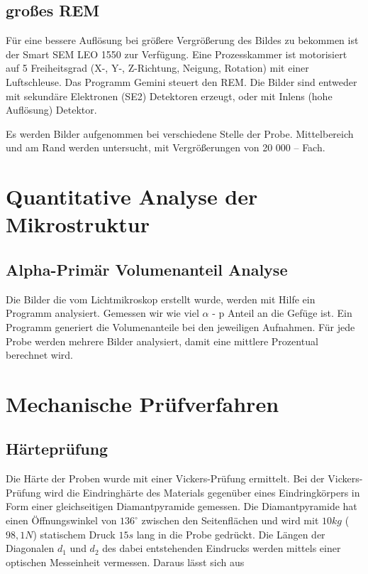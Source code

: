 	\subsection{großes REM}
		
Für eine bessere Auflösung bei größere Vergrößerung des Bildes zu bekommen ist der Smart SEM LEO 1550 zur Verfügung. Eine Prozesskammer ist motorisiert auf 5 Freiheitsgrad (X-, Y-, Z-Richtung, Neigung, Rotation) mit einer Luftschleuse. Das Programm Gemini steuert den REM. Die Bilder sind entweder mit sekundäre Elektronen (SE2) Detektoren erzeugt, oder mit Inlens (hohe Auflösung) Detektor. 

Es werden Bilder aufgenommen bei verschiedene Stelle der Probe. Mittelbereich und am Rand werden untersucht, mit Vergrößerungen von 20 000 – Fach. 



	
\section{Quantitative Analyse der Mikrostruktur}


	\subsection{Alpha-Primär Volumenanteil Analyse}
	
	Die Bilder die vom Lichtmikroskop erstellt wurde, werden mit Hilfe ein Programm analysiert. Gemessen wir wie viel $\alpha$ - p Anteil an die Gefüge ist. Ein Programm generiert die Volumenanteile bei den jeweiligen Aufnahmen. Für jede Probe werden mehrere Bilder analysiert, damit eine mittlere Prozentual berechnet wird. 
	



\section{Mechanische Prüfverfahren}

\subsection{Härteprüfung}

Die Härte der Proben wurde mit einer Vickers-Prüfung ermittelt. Bei der Vickers-Prüfung wird die Eindringhärte des Materials gegenüber eines Eindringkörpers in Form einer gleichseitigen Diamantpyramide gemessen. Die Diamantpyramide hat einen Öffnungswinkel von $136^\circ$ zwischen den Seitenflächen und wird mit $10 kg$ ($98,1 N$) statischem Druck $15 s$ lang in die Probe gedrückt. Die Längen der Diagonalen $d_1$ und $d_2$ des dabei entstehenden Eindrucks werden mittels einer optischen Messeinheit vermessen. Daraus lässt sich aus

